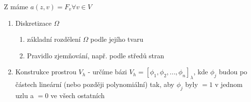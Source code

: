\documentclass[../main.tex]{subfiles}
\begin{document}
Z  máme $a(z,v) = F_v \forall v \in V$ 


\begin{enumerate}
    \item Diskretizace $\Omega$ 
    \begin{enumerate}
        \item základní rozdělení $\Omega$ podle jejího tvaru
        \item Pravidlo zjemňování, např. podle středů stran
    \end{enumerate}
    \item Konstrukce prostrou $V_h$ - určíme bázi $V_h =  [\phi_1, \phi_2, ... , \phi_n ]_\lambda$, kde $\phi_j$ budou po částech lineární (nebo později polynomiální) tak, aby $\phi_j$ byly $=1$ v jednom uzlu a $=0$ ve všech ostatních
\end{enumerate}
\end{document}
